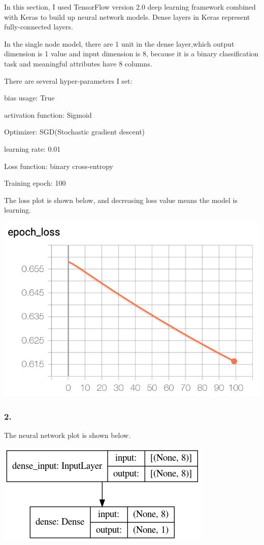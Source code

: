 \documentclass{article}
\begin{document}
In this section, I used TensorFlow version 2.0 deep learning framework combined with Keras to build up neural network models. Dense layers in Keras represent fully-connected layers. 

In the single node model, there are 1 unit in the dense layer,which output dimension is 1 value and input dimension is 8, because it is a binary classification task and meaningful attributes have 8 columns.

There are several hyper-parameters I set:

bias usage: True

activation function: Sigmoid

Optimizer: SGD(Stochastic gradient descent)

learning rate: 0.01

Loss function: binary cross-entropy

Training epoch: 100

The loss plot is shown below, and decreasing loss value means the model is learning.

\includegraphics[scale=0.5]{single_layer_loss.png}

\subsubsection{2.}

The neural network plot is shown below.

\includegraphics[scale=0.5]{single_layer_model.png}
\end{document}
